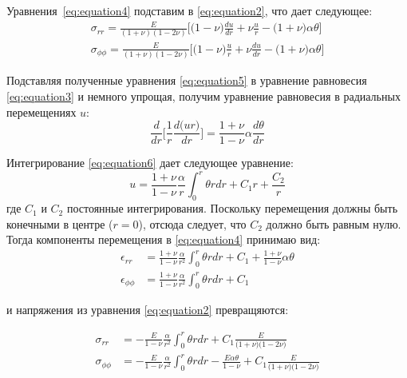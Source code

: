 Уравнения~\cref{eq:equation4} подставим в \cref{eq:equation2}, что дает следующее:
\begin{equation}
	\label{eq:equation5}
	\begin{split}
		\sigma_{rr} = \frac{E}{(1+\nu)(1-2\nu)} \big[\big(1-\nu \big)\frac{du}{dr} + \nu\frac{u}{r} - \big(1+\nu\big )\alpha\theta\big] \\
		\sigma_{\phi\phi} = \frac{E}{(1+\nu)(1-2\nu)} \big[\big(1-\nu \big)\frac{u}{r} + \nu\frac{du}{dr} - \big(1+\nu\big )\alpha\theta\big] 
	\end{split}
\end{equation}

Подставляя полученные уравнения \cref{eq:equation5} в уравнение равновесия \cref{eq:equation3} и немного упрощая, получим уравнение равновесия в радиальных перемещениях \(u\):
\begin{equation}
	\label{eq:equation6}
	\frac {d}{dr} \big[\frac{1}{r} \frac{d \big(ur \big)}{dr} \big] = \frac{1+\nu}{1-\nu}\alpha\frac{d\theta}{dr}
\end{equation}

Интегрирование \cref{eq:equation6} дает следующее уравнение:
\begin{equation}
	\label{eq:equation7}
	u = \frac{1+\nu}{1-\nu} \frac{\alpha}{r} \int_0^r \theta rdr +C_1r +\frac{C_2}{r}
\end{equation}
где \(C_1\) и \(C_2\) постоянные интегрирования. Поскольку перемещения должны быть конечными в центре (\(r=0\)), отсюда следует, что \(C_2\) должно быть равным нулю. Тогда компоненты перемещения в \cref{eq:equation4} принимаю вид:
\begin{equation}
	\label{eq:equation8}
	\begin{split}
		\epsilon_{rr} &= \frac{1+\nu}{1-\nu} \frac{\alpha}{r^2} \int_0^r \theta rdr +C_1 + \frac{1+\nu}{1-\nu} \alpha\theta\\
		\epsilon_{\phi\phi} &= \frac{1+\nu}{1-\nu} \frac{\alpha}{r^2} \int_0^r \theta rdr +C_1
	\end{split}
\end{equation}

и напряжения из уравнения \cref{eq:equation2} превращяются:

\begin{equation}
	\label{eq:equation9}
	\begin{split}
		\sigma_{rr} &= -\frac{E}{1-\nu} \frac{\alpha}{r^2} \int_0^r \theta rdr +C_1 \frac{E}{\big(1+\nu\big)\big(1-2\nu\big)}\\
		\sigma_{\phi\phi} &= -\frac{E}{1-\nu} \frac{\alpha}{r^2} \int_0^r \theta rdr -\frac{E \alpha \theta}{1-\nu} +C_1\frac{E}{\big(1+\nu\big)\big(1-2\nu\big)}
	\end{split}
\end{equation}


